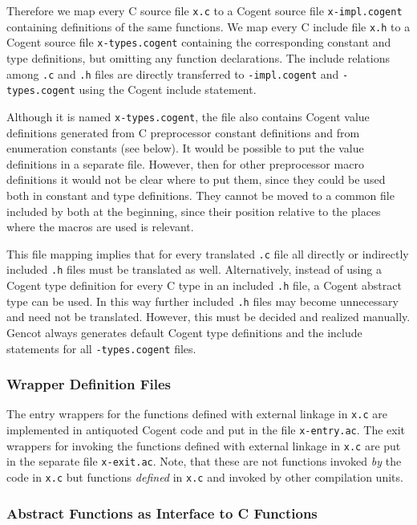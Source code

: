 \documentclass[a4paper]{report}
\newcommand{\code}[1]{\textnormal{\texttt{#1}}}
\begin{document}
Therefore we map every C source file \code{x.c} to a Cogent source file \code{x-impl.cogent} containing definitions of the same 
functions. We map every C include file \code{x.h} to a Cogent source file \code{x-types.cogent} 
containing the corresponding constant and type definitions, but omitting any function declarations. The include relations among 
\code{.c} and \code{.h} files are directly transferred to \code{-impl.cogent} and \code{-types.cogent} using the Cogent include
statement. 

Although it is named \code{x-types.cogent}, the file also contains Cogent value definitions generated from C preprocessor
constant definitions and from enumeration constants (see below). It would be possible to put the value definitions in a 
separate file. However, then for other preprocessor macro definitions it would not be clear where to put them, since they could
be used both in constant and type definitions. They cannot be moved to a common file included by both at the beginning,
since their position relative to the places where the macros are used is relevant.

This file mapping implies that for every translated \code{.c} file all directly or indirectly included \code{.h} files must be 
translated as well.
Alternatively, instead of using a Cogent type definition for every C type in an included \code{.h} file, a Cogent abstract type
can be used. In this way further included \code{.h} files may become unnecessary and need not be translated. However, this
must be decided and realized manually. Gencot always generates default Cogent type definitions and the include statements for all
\code{-types.cogent} files.

\subsubsection{Wrapper Definition Files}

The entry wrappers for the functions defined with external linkage in \code{x.c} are implemented in antiquoted Cogent code and
put in the file \code{x-entry.ac}. The exit wrappers for invoking the functions defined with external linkage in \code{x.c} 
are put in the separate file \code{x-exit.ac}. Note, that these are not functions invoked \textit{by} the code in \code{x.c}
but functions \textit{defined} in \code{x.c} and invoked by other compilation units.

\subsubsection{Abstract Functions as Interface to C Functions}
\end{document}

